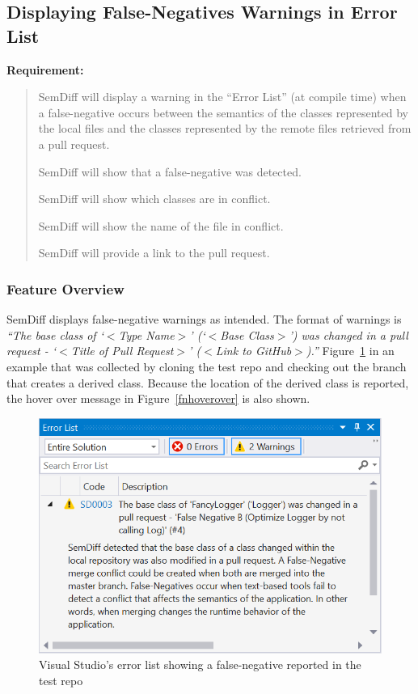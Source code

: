 \documentclass[draftclsnofoot,onecolumn]{IEEEtran}
\begin{document}
\subsection{Displaying False-Negatives Warnings in Error List}%

\textbf{Requirement:}

\begin{quote}

SemDiff will display a warning in the ``Error List'' (at compile time) when a false-negative occurs between the semantics of the classes represented by the local files and the classes represented by the remote files retrieved from a pull request.

SemDiff will show that a false-negative was detected.

SemDiff will show which classes are in conflict.

SemDiff will show the name of the file in conflict.

SemDiff will provide a link to the pull request.

\end{quote}

\subsubsection{Feature Overview}

SemDiff displays false-negative warnings as intended. The format of warnings is \textit{``The base class of `$<$Type Name$>$' (`$<$Base Class$>$') was changed in a pull request - `$<$Title of Pull Request$>$' ($<$Link to GitHub$>$).''}  Figure~\ref{fnerrorlist} in an example that was collected by cloning the test repo and checking out the branch that creates a derived class. Because the location of the derived class is reported, the hover over message in Figure~\ref{fnhoverover} is also shown.

\begin{figure}[!htb]
\centering
\includegraphics[scale=1]{FalseNegativeErrorList}
\caption{Visual Studio's error list showing a false-negative reported in 
the test repo}
\label{fnerrorlist}
\end{figure}
\end{document}
